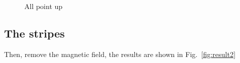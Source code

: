 \documentclass[aps,superscriptaddress,groupedaddress]{revtex4}  %
\begin{document}
\begin{figure}[htb]
\caption{All point up}
\label{fig:result1}
\end{figure}

\subsection{\label{sec:6.2}The stripes}

Then, remove the magnetic field, the results are shown in Fig.~\ref{fig:result2}
\end{document}
